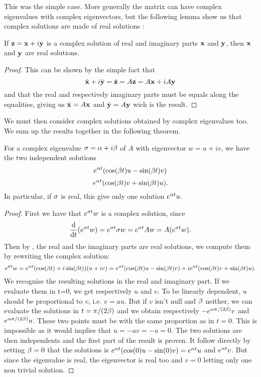 This was the simple case. More generally the matrix can have complex eigenvalues with complex eigenvectors, but the following lemma show us that complex solutions are made of real solutions :
\begin{lemme} \label{lem:complex}
If $\mathbf{z}=\mathbf{x}+i\mathbf{y}$ is a complex solution of real and imaginary parts $\mathbf{x}$ and $\mathbf{y}$, then $\mathbf{x}$ and $\mathbf{y}$ are real solutions.
\end{lemme}
\begin{proof}
This can be shown by the simple fact that
\[\dot{\mathbf{x}}+i\dot{\mathbf{y}} =\dot{\mathbf{z}} = A\mathbf{z} = A\mathbf{x}+iA\mathbf{y} \]
and that the real and respectively imaginary parts must be equals along the equalities, giving us $\dot{\mathbf{x}}=A\mathbf{x}$ and $\dot{\mathbf{y}}=A\mathbf{y}$ wich is the result.
\end{proof}
We must then consider complex solutions obtained by complex eigenvalues too. We sum up the results together in the following theorem.
\begin{theoreme} \label{th:eigensolutions}
For a complex eigenvalue $\sigma=\alpha+i\beta$ of $A$ with eigenvector $w=u+iv$, we have the two independent solutions
\[e^{\alpha t}(\cos(\beta t)u - \sin(\beta t)v)\] 
\[e^{\alpha t}(\cos(\beta t)v + \sin(\beta t)u).\] 
In particular, if $\sigma$ is real, this give only one solution $e^{\alpha t}u.$ 
\end{theoreme}
\begin{proof}
First we have that $e^{\sigma t}w$ is a complex solution, since 
\[\frac{\mathrm{d}}{\mathrm{d} t}(e^{\sigma t}w) = e^{\sigma t}\sigma w = e^{\sigma t}Aw = A(e^{\sigma t}w).\]
Then by , the real and the imaginary parts are real solutions, we compute them by rewriting the complex solution:
\[e^{\sigma t}w = e^{\alpha t}(\cos(\beta t) + i\sin(\beta t))(u+iv)
= e^{\alpha t}(\cos(\beta t)u - \sin(\beta t)v) + ie^{\alpha t}(\cos(\beta t)v + \sin(\beta t)u).\]
We recognise the resulting solutions in the real and imaginary part. If we evaluate them in t=0, we get respectively $u$ and $v$. To be linearly dependent, $u$ should be proportional to $v$, i.e. $v=au$. But if $v$ isn't null and $\beta$ neither, we can evaluate the solutions in $t=\pi/(2\beta)$ and we obtain respectively $-e^{\alpha\pi/(2\beta)}v$ and $e^{\alpha\pi/(2\beta)}u$. These two points must be with the same proportion as in $t=0$. This is impossible as it would implies that $u=-av=-u=0$. The two solutions are then independents and the first part of the result is proven. It follow directly by setting $\beta=0$ that the solutions is $e^{\alpha t}(\cos(0)u - \sin(0)v) = e^{\alpha t}u$ and  $e^{\alpha t}v$. But since the eigenvalue is real, the eigenvector is real too and $v=0$ letting only one non trivial solution.
\end{proof}
